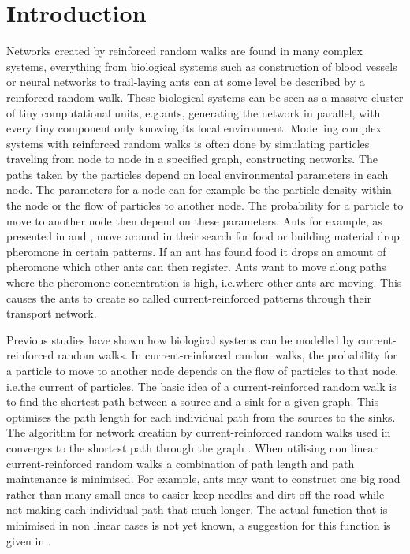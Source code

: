 \section{Introduction}
\label{sec:introduction}
Networks created by reinforced random walks are found in many complex systems, everything from biological systems such as construction of blood vessels or neural networks to trail-laying ants can at some level be described by a reinforced random walk. These biological systems can be seen as a massive cluster of tiny computational units, e.g.\@ ants, generating the network in parallel, with every tiny component only knowing its local environment. Modelling complex systems with reinforced random walks is often done by simulating particles traveling from node to node in a specified graph, constructing networks. The paths taken by the particles depend on local environmental parameters in each node. The parameters for a node can for example be the particle density within the node or the flow of particles to another node. The probability for a particle to move to another node then depend on these parameters. Ants for example, as presented in \cite{Schweitzer1997153} and \cite{Jackson}, move around in their search for food or building material drop pheromone in certain patterns. If an ant has found food it drops an amount of pheromone which other ants can then register. Ants want to move along paths where the pheromone concentration is high, i.e.\@ where other ants are moving. This causes the ants to create so called current-reinforced patterns through their transport network.

Previous studies have shown how biological systems can be modelled by current-reinforced random walks. In current-reinforced random walks, the probability for a particle to move to another node depends on the flow of particles to that node, i.e.\@ the current of particles. The basic idea of a current-reinforced random walk is to find the shortest path between a source and a sink for a given graph. This optimises the path length for each individual path from the sources to the sinks. The algorithm for network creation by current-reinforced random walks used in \cite{Sumpter} converges to the shortest path through the graph \cite{Ito}. When utilising non linear current-reinforced random walks a combination of path length and path maintenance is minimised. For example, ants may want to construct one big road rather than many small ones to easier keep needles and dirt off the road while not making each individual path that much longer. The actual function that is minimised in non linear cases is not yet known, a suggestion for this function is given in \cite{Sumpter}.

